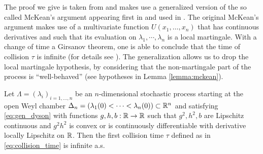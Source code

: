 The proof we give is taken from \cite{article:multiyamada} and makes use a generalized version of the so called McKean's argument appearing first in \cite{book:mckean} and used in \cite{bru1989diffusions}. The original McKean's argument makes use of a multivariate function $U(x_1, \dots,x_n)$ that has continuous derivatives and such that its evaluation on $\lambda_1, \cdots, \lambda_n$ is a local martingale. With a change of time a Girsanov theorem, one is able to conclude that the time of collision $\tau$ is infinite (for details see \cite{bru1989diffusions}). The generalization allows us to drop the local martingale hypothesis, by considering that the non-martingale part of the process is ``well-behaved'' (see hypotheses in Lemma \ref{lemma:mckean}). 

\begin{theorem} \label{thm:collision}
    Let $\Lambda = (\lambda_i)_{i=1,\dots,n}$ be an $n$-dimensional stochastic process starting at the open Weyl chamber $\Delta_n = (\lambda_1(0)<\cdots <\lambda_n(0)) \subset \mathbb R^n$ and satisfying \eqref{eq:gen_dyson} with functions $g,h,b:\mathbb R \to \mathbb R$ such that $g^2, h^2, b$ are Lipschitz continuous and $g^2h^2$ is convex or is continuously differentiable with derivative locally Lipschitz on $\mathbb R$. Then the first collision time $\tau$ defined as in \eqref{eq:collision_time} is infinite a.s.
\end{theorem}

